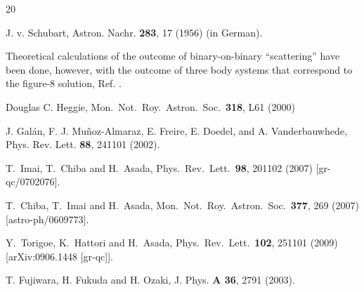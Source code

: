 \documentclass[twocolumn,showpacs,showkeys,preprintnumbers,amsmath,amssymb]{revtex4}
\begin{document}
\begin{thebibliography}{20}

J. v. Schubart, 
Astron. Nachr. {\bf 283}, 17 (1956) (in German).

Theoretical calculations of the outcome of binary-on-binary ``scattering''
have been done, 
however, with the outcome of three body systems that correspond to the
figure-8 solution, 
Ref. \cite{Heggie:2000ad}.

  Douglas C. Heggie,
  Mon.\ Not.\ Roy.\ Astron.\ Soc.\  {\bf 318}, L61 (2000)

J. Gal\' an, F. J. Mu\~noz-Almaraz, E. Freire, E. Doedel, and A. Vanderbauwhede, 
Phys. Rev. Lett. {\bf 88}, 241101 (2002).

T.~Imai, T.~Chiba and H.~Asada,
  Phys.\ Rev.\ Lett.\  {\bf 98}, 201102 (2007)
  [gr-qc/0702076].

  T.~Chiba, T.~Imai and H.~Asada,
  Mon.\ Not.\ Roy.\ Astron.\ Soc.\  {\bf 377}, 269 (2007)
  [astro-ph/0609773].

  Y.~Torigoe, K.~Hattori and H.~Asada,
  Phys.\ Rev.\ Lett.\  {\bf 102}, 251101 (2009)
  [arXiv:0906.1448 [gr-qc]].

T. Fujiwara, H. Fukuda and H. Ozaki,
J. Phys. {\bf A 36}, 2791 (2003).

\end{thebibliography}
\end{document}
